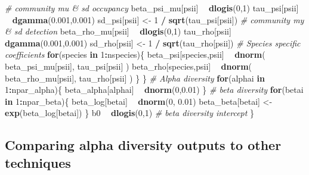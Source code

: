 \documentclass[
]{article}
\newenvironment{Shaded}{\begin{snugshade}}{\end{snugshade}}
\newcommand{\CommentTok}[1]{\textcolor[rgb]{0.56,0.35,0.01}{\textit{#1}}}
\newcommand{\ControlFlowTok}[1]{\textcolor[rgb]{0.13,0.29,0.53}{\textbf{#1}}}
\newcommand{\DecValTok}[1]{\textcolor[rgb]{0.00,0.00,0.81}{#1}}
\newcommand{\FloatTok}[1]{\textcolor[rgb]{0.00,0.00,0.81}{#1}}
\newcommand{\KeywordTok}[1]{\textcolor[rgb]{0.13,0.29,0.53}{\textbf{#1}}}
\newcommand{\NormalTok}[1]{#1}
\newcommand{\OperatorTok}[1]{\textcolor[rgb]{0.81,0.36,0.00}{\textbf{#1}}}
\newcommand{\StringTok}[1]{\textcolor[rgb]{0.31,0.60,0.02}{#1}}
\begin{document}
\begin{Shaded}
\begin{Highlighting}[]
    \CommentTok{# community mu & sd occupancy}
\NormalTok{    beta_psi_mu[psii] }\OperatorTok{~}\StringTok{ }\KeywordTok{dlogis}\NormalTok{(}\DecValTok{0}\NormalTok{,}\DecValTok{1}\NormalTok{)}
\NormalTok{    tau_psi[psii] }\OperatorTok{~}\StringTok{ }\KeywordTok{dgamma}\NormalTok{(}\FloatTok{0.001}\NormalTok{,}\FloatTok{0.001}\NormalTok{)}
\NormalTok{    sd_psi[psii] <-}\StringTok{ }\DecValTok{1} \OperatorTok{/}\StringTok{ }\KeywordTok{sqrt}\NormalTok{(tau_psi[psii])}
    \CommentTok{# community my & sd detection}
\NormalTok{    beta_rho_mu[psii] }\OperatorTok{~}\StringTok{ }\KeywordTok{dlogis}\NormalTok{(}\DecValTok{0}\NormalTok{,}\DecValTok{1}\NormalTok{)}
\NormalTok{    tau_rho[psii] }\OperatorTok{~}\StringTok{ }\KeywordTok{dgamma}\NormalTok{(}\FloatTok{0.001}\NormalTok{,}\FloatTok{0.001}\NormalTok{)}
\NormalTok{    sd_rho[psii] <-}\StringTok{ }\DecValTok{1} \OperatorTok{/}\StringTok{ }\KeywordTok{sqrt}\NormalTok{(tau_rho[psii])}
    \CommentTok{# Species specific coefficients}
    \ControlFlowTok{for}\NormalTok{(species }\ControlFlowTok{in} \DecValTok{1}\OperatorTok{:}\NormalTok{nspecies)\{}
\NormalTok{      beta_psi[species,psii] }\OperatorTok{~}\StringTok{ }\KeywordTok{dnorm}\NormalTok{(}
\NormalTok{        beta_psi_mu[psii],}
\NormalTok{        tau_psi[psii]}
\NormalTok{      )}
\NormalTok{      beta_rho[species,psii] }\OperatorTok{~}\StringTok{ }\KeywordTok{dnorm}\NormalTok{(}
\NormalTok{        beta_rho_mu[psii],}
\NormalTok{        tau_rho[psii]}
\NormalTok{      )}
\NormalTok{    \}}
\NormalTok{  \}}
  \CommentTok{# Alpha diversity}
  \ControlFlowTok{for}\NormalTok{(alphai }\ControlFlowTok{in} \DecValTok{1}\OperatorTok{:}\NormalTok{npar_alpha)\{}
\NormalTok{    beta_alpha[alphai] }\OperatorTok{~}\StringTok{ }\KeywordTok{dnorm}\NormalTok{(}\DecValTok{0}\NormalTok{,}\FloatTok{0.01}\NormalTok{)}
\NormalTok{  \}}
  \CommentTok{# beta diversity}
  \ControlFlowTok{for}\NormalTok{(betai }\ControlFlowTok{in} \DecValTok{1}\OperatorTok{:}\NormalTok{npar_beta)\{}
\NormalTok{    beta_log[betai] }\OperatorTok{~}\StringTok{ }\KeywordTok{dnorm}\NormalTok{(}\DecValTok{0}\NormalTok{, }\FloatTok{0.01}\NormalTok{)}
\NormalTok{    beta_beta[betai] <-}\StringTok{  }\KeywordTok{exp}\NormalTok{(beta_log[betai])}
\NormalTok{  \}}
\NormalTok{  b0 }\OperatorTok{~}\StringTok{ }\KeywordTok{dlogis}\NormalTok{(}\DecValTok{0}\NormalTok{,}\DecValTok{1}\NormalTok{) }\CommentTok{# beta diversity intercept}
\NormalTok{\}}
\end{Highlighting}
\end{Shaded}

\hypertarget{comparing-alpha-diversity-outputs-to-other-techniques}{%
\subsection{Comparing alpha diversity outputs to other
techniques}\label{comparing-alpha-diversity-outputs-to-other-techniques}}
\end{document}
